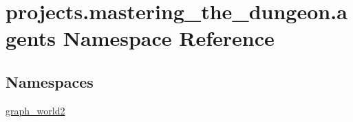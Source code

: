 \hypertarget{namespaceprojects_1_1mastering__the__dungeon_1_1agents}{}\section{projects.\+mastering\+\_\+the\+\_\+dungeon.\+agents Namespace Reference}
\label{namespaceprojects_1_1mastering__the__dungeon_1_1agents}
\subsection*{Namespaces}
\begin{DoxyCompactItemize}
\item 
 \hyperlink{namespaceprojects_1_1mastering__the__dungeon_1_1agents_1_1graph__world2}{graph\+\_\+world2}
\end{DoxyCompactItemize}
